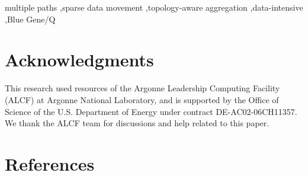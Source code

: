 \documentclass[final,5p,times]{elsarticle}
\begin{document}
\begin{frontmatter}
\begin{abstract}
\end{abstract}

\begin{keyword}
multiple paths \sep sparse data movement \sep topology-aware aggregation \sep data-intensive \sep Blue Gene/Q



\end{keyword}

\end{frontmatter}
















\section*{Acknowledgments}

This research used resources of the Argonne Leadership Computing Facility (ALCF) at Argonne National Laboratory, and is supported by the Office of Science of the U.S. Department of Energy under contract DE-AC02-06CH11357. We thank the ALCF team for discussions and help related to this paper.



\section*{References}

 






\end{document}
